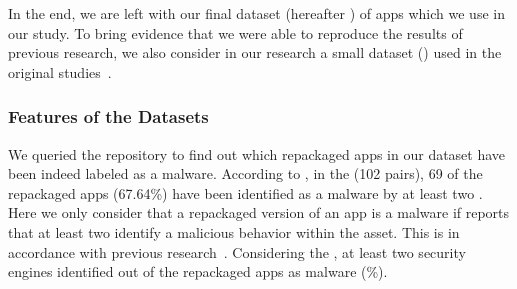 In the end, we are left with our final dataset (hereafter \cds) of \apps apps which we use in our study. 
To bring evidence that we were able to reproduce the results of previous research, we also consider in our research
a small dataset (\sds) used in the original studies~\cite{DBLP:conf/wcre/BaoLL18,DBLP:journals/jss/CostaMMSSBNR22}.







\subsubsection{Features of the Datasets}
 
We queried the \vt repository to find out which repackaged apps in our
dataset have been indeed labeled as a malware.
According to \vt, in the \sds (102 pairs),
69 of the repackaged apps (67.64\%) have been identified as a malware by at least two
\ses. Here we only consider that a repackaged version of an app is a malware if \vt reports that at least
two \ses identify a malicious behavior within the asset. This is in accordance with previous research~\cite{vt-label,DBLP:journals/ese/KhanmohammadiEH19}. Considering the \cds, at least two security engines identified \malwares out of the \apps repackaged apps as malware (\malwaresP\%).

